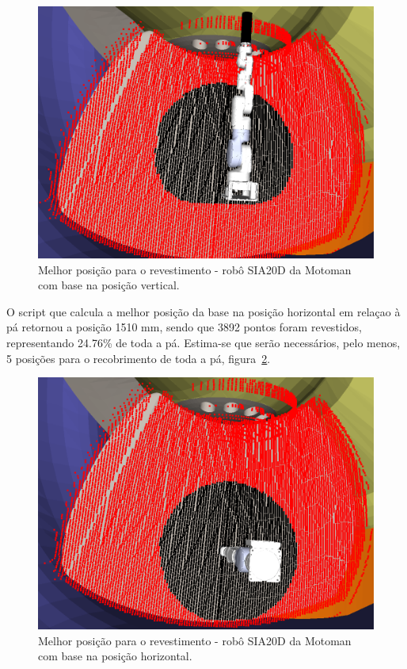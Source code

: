 \begin{figure}[h!]	
	\includegraphics[width=\columnwidth]{figs/bighatch/sia20d_bestposv.png}
	\caption{Melhor posição para o revestimento - robô SIA20D da Motoman com base
	na posição vertical.}
	\label{fig::sia20dbestposv}
\end{figure}

O script que calcula a melhor posição da base na posição horizontal em relaçao à
pá retornou a posição 1510 mm, sendo que 3892 pontos foram revestidos,
representando 24.76\% de toda a pá. Estima-se que serão necessários, pelo menos,
5 posições para o recobrimento de toda a pá, figura~\ref{fig::sia20dbestposh}.

\begin{figure}[h!]	
	\includegraphics[width=\columnwidth]{figs/bighatch/sia20d_bestposh.png}
	\caption{Melhor posição para o revestimento - robô SIA20D da Motoman com base
	na posição horizontal.}
	\label{fig::sia20dbestposh}
\end{figure}
